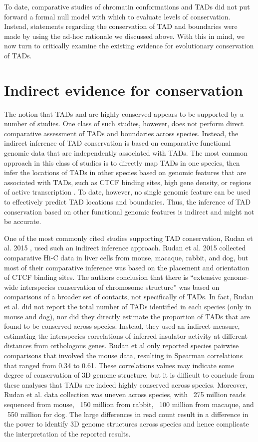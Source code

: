 To date, comparative studies of chromatin conformations and TADs did not put forward a formal null model with which to evaluate levels of conservation. Instead, statements regarding the conservation of TAD and boundaries were made by using the ad-hoc rationale we discussed above. With this in mind, we now turn to critically examine the existing evidence for evolutionary conservation of TADs.

\section{Indirect evidence for conservation}
The notion that TADs and are highly conserved appears to be supported by a number of studies. One class of such studies, however, does not perform direct comparative assessment of TADs and boundaries across species. Instead, the indirect inference of TAD conservation is based on comparative functional genomic data that are independently associated with TADs. The most common approach in this class of studies is to directly map TADs in one species, then infer the locations of TADs in other species based on genomic features that are associated with TADs, such as CTCF binding sites, high gene density, or regions of active transcription \cite{Dixon.2012, Nora.2012, Rudan.2015, Kentepozidou.2020, Dekker.2015}. To date, however, no single genomic feature can be used to effectively predict TAD locations and boundaries. Thus, the inference of TAD conservation based on other functional genomic features is indirect and might not be accurate. 

One of the most commonly cited studies supporting TAD conservation, Rudan et al. 2015 \cite{Rudan.2015}, used such an indirect inference approach. Rudan et al. 2015 \cite{Rudan.2015} collected comparative Hi-C data in liver cells from mouse, macaque, rabbit, and dog, but most of their comparative inference was based on the placement and orientation of CTCF binding sites. The authors conclusion that there is ``extensive genome-wide interspecies conservation of chromosome structure'' was based on comparisons of a broader set of contacts, not specifically of TADs. In fact, Rudan et al. did not report the total number of TADs identified in each species (only in mouse and dog), nor did they directly estimate the proportion of TADs that are found to be conserved across species. Instead, they used an indirect measure, estimating the interspecies correlations of inferred insulator activity \cite{Sofueva.2013} at different distances from orthologous genes. Rudan et al only reported species pairwise comparisons that involved the mouse data, resulting in Spearman correlations that ranged from 0.34 to 0.61. These correlations values may indicate some degree of conservation of 3D genome structure, but it is difficult to conclude from these analyses that TADs are indeed highly conserved across species. Moreover, Rudan et al. data collection was uneven across species, with ~275 million reads sequenced from mouse, ~150 million from rabbit, ~100 million from macaque, and ~550 million for dog. The large differences in read count result in a difference in the power to identify 3D genome structures across species and hence complicate the interpretation of the reported results. 

